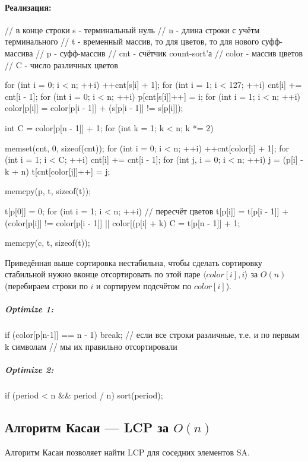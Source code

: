 \paragraph*{Реализация:}
\begin{cppcode}
// в конце строки s - терминальный нуль
// n - длина строки с учётм терминального
// t - временный массив, то для цветов, то для нового суфф-массива
// p - суфф-массив
// cnt - счётчик count-sort'а
// color - массив цветов
// C - число различных цветов

for (int i = 0; i < n; ++i)
		++cnt[s[i] + 1];
for (int i = 1; i < 127; ++i)
		cnt[i] += cnt[i - 1];
for (int i = 0; i < n; ++i)
		p[cnt[s[i]]++] = i;
for (int i = 1; i < n; ++i)
		color[p[i]] = color[p[i - 1]] + (s[p[i - 1]] != s[p[i]]);
	
int C = color[p[n - 1]] + 1;
for (int k = 1; k < n; k *= 2) {
		memset(cnt, 0, sizeof(cnt));
	for (int i = 0; i < n; ++i)
			++cnt[color[i] + 1];
	for (int i = 1; i < C; ++i)
			cnt[i] += cnt[i - 1];
	for (int j, i = 0; i < n; ++i) {
			j = (p[i] - k + n) %
			t[cnt[color[j]]++] = j;
	}
	
	memcpy(p, t, sizeof(t));
	
	t[p[0]] = 0;
	for (int i = 1; i < n; ++i) // пересчёт цветов
		t[p[i]] = t[p[i - 1]] + (color[p[i]] != color[p[i - 1]] || color[(p[i] + k) %
	C = t[p[n - 1]] + 1;
	
	memcpy(c, t, sizeof(t));
}
\end{cppcode}

Приведённая выше сортировка нестабильна, чтобы сделать сортировку стабильной нужно вконце отсортировать 
по этой паре	$\langle color[i], i \rangle$ за $O(n)$ (перебираем строки по $i$ и сортируем подсчётом по $color[i]$).

\subparagraph{Optimize 1:}
\begin{cppcode} 
	if (color[p[n-1]] == n - 1) break;
		// если все строки различные, т.е. и по первым k символам
		// мы их правильно отсортировали
\end{cppcode} 

\subparagraph{Optimize 2:}
\begin{cppcode} 
	if (period < n && period / n) 
		sort(period);
\end{cppcode}

\subsection{Алгоритм Касаи --- LCP за $O(n)$}
Алгоритм Касаи позволяет найти LCP для соседних элементов SA.

